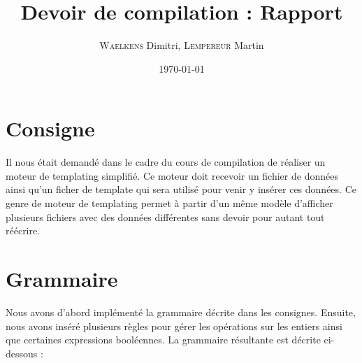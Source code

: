 \documentclass[10pt,a4paper]{article}
\author{\textsc{Waelkens} Dimitri, \textsc{Lempereur} Martin}
\begin{document}
\title{\LARGE{Devoir de compilation : Rapport}}
\date{\today}
\maketitle
\newpage
\tableofcontents
\newpage

\section{Consigne}
Il nous était demandé dans le cadre du cours de compilation de réaliser un moteur de templating simplifié.
Ce moteur doit recevoir un fichier de données ainsi qu'un ficher de template qui sera utilisé pour venir y insérer ces données.
Ce genre de moteur de templating permet à partir d'un même modèle d'afficher plusieurs fichiers avec des données différentes sans devoir pour autant tout réécrire.
\section{Grammaire}
Nous avons d'abord implémenté la grammaire décrite dans les consignes.
Ensuite, nous avons inséré plusieurs règles pour gérer les opérations sur les entiers ainsi que certaines expressions booléennes.
La grammaire résultante est décrite ci-dessous :\\
\end{document}
